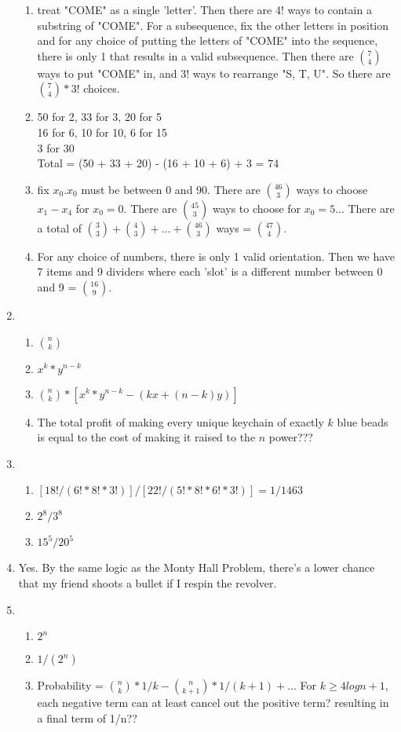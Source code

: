 \documentclass[a4paper]{article}
\newcommand{\<}{\langle}
\renewcommand{\>}{\rangle}
\renewcommand{\^}{\wedge}
\begin{document}
\begin{enumerate}
\begin{enumerate}
            \item treat "COME" as a single 'letter'. Then there are 4! ways to contain a substring of "COME". For a subsequence, fix the other letters in position and for any choice of putting the letters of "COME" into the sequence, there is only 1 that results in a valid subsequence. Then there are ${7 \choose 4}$ ways to put "COME" in, and 3! ways to rearrange "S, T, U". So there are ${7 \choose 4} * 3!$ choices.
            \item 50 for 2, 33 for 3, 20 for 5\\
            16 for 6, 10 for 10, 6 for 15\\
            3 for 30\\
            Total = (50 + 33 + 20) - (16 + 10 + 6) + 3 = 74
            \item fix $x_0. x_0$ must be between 0 and 90. There are $46 \choose 3$ ways to choose $x_1 - x_4$ for $x_0  = 0$. There are $45 \choose 3$ ways to choose for $x_0 = 5$... There are a total of ${3 \choose 3} + {4\choose 3} + ... + {46 \choose 3}$ ways = ${47 \choose 4}$.
            \item For any choice of numbers, there is only 1 valid orientation. Then we have 7 items and 9 dividers where each 'slot' is a different number between 0 and 9 = ${16 \choose 9}$. 
        \end{enumerate}
    \item
        \begin{enumerate}
            \item ${n \choose k}$
            \item $x^k * y^{n-k}$
            \item ${n \choose k} * [x^k * y^{n-k} - (kx + (n-k)y)]$
            \item The total profit of making every unique keychain of exactly $k$ blue beads is equal to the cost of making it raised to the $n$ power???
        \end{enumerate}
    \item
        \begin{enumerate}
            \item $[18! / (6! * 8! * 3!)] / [22! / (5! * 8! * 6! * 3!)] = 1/1463$
            \item $2^8 / 3^8$
            \item $15^5 / 20^ 5$
        \end{enumerate}
    \item
        Yes. By the same logic as the Monty Hall Problem, there's a lower chance that my friend shoots a bullet if I respin the revolver.
    \item
        \begin{enumerate}
            \item $2^n$
            \item $1/(2^n)$
            \item Probability = ${n \choose k} * 1/k - {n \choose k+1} * 1/(k+1) + ...$ For $k \geq 4logn + 1$, each negative term can at least cancel out the positive term? resulting in a final term of 1/n??
        \end{enumerate}
\end{enumerate}
\end{document}

